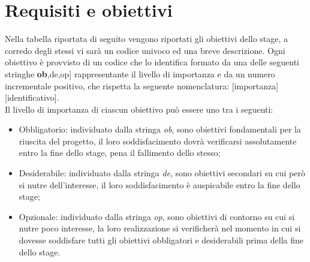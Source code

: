 \section{Requisiti e obiettivi}
Nella tabella riportata di seguito vengono riportati gli obiettivi dello stage, a corredo degli stessi vi sarà un codice univoco ed una breve descrizione. Ogni obiettivo è provvisto di un codice che lo identifica formato da una delle seguenti stringhe \textbf{ob},de,op] rappresentante il livello di importanza e da un numero incrementale positivo, che rispetta la seguente nomenclatura: [importanza][identificativo].\\ 
Il livello di importanza di ciascun obiettivo può essere uno tra i seguenti:
\begin{itemize}
    \item Obbligatorio: individuato dalla stringa \textit{ob}, sono obiettivi fondamentali per la riuscita del progetto, il loro soddisfacimento dovrà verificarsi assolutamente entro la fine dello stage, pena il fallimento dello stesso;
    \item Desiderabile: individuato dalla stringa \textit{de}, sono obiettivi secondari su cui però si nutre dell'interesse, il loro soddisfacimento è auspicabile entro la fine dello stage;
    \item Opzionale: individuato dalla stringa \textit{op}, sono obiettivi di contorno su cui si nutre poco interesse, la loro realizzazione si verificherà nel momento in cui si dovesse soddisfare tutti gli obiettivi obbligatori e desiderabili prima della fine dello stage.
\end{itemize}

